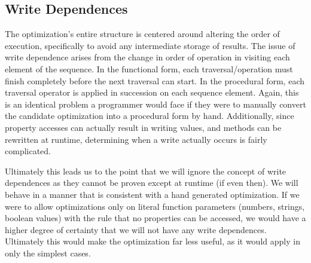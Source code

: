 \subsection{Write Dependences}

The optimization's entire structure is centered around altering the order of execution, specifically to avoid any intermediate storage of results. The issue of write dependence arises from the change in order of operation in visiting each element of the sequence.  In the functional form, each traversal/operation must finish completely before the next traversal can start.  In the procedural form, each traversal operator is applied in succession on each sequence element.  Again, this is an identical problem a programmer would face if they were to manually convert the candidate optimization into a procedural form by hand.  Additionally, since property accesses can actually result in writing values, and methods can be rewritten at runtime, determining when a write actually occurs is fairly complicated. 

Ultimately this leads us to the point that we will ignore the concept of write dependences as they cannot be proven except at runtime (if even then).  We will behave in a manner that is consistent with a hand generated optimization.  If we were to allow optimizations only on literal function parameters (numbers, strings, boolean values) with the rule that no properties can be accessed, we would have a higher degree of certainty that we will not have any write dependences.  Ultimately this would make the optimization far less useful, as it would apply in only the simplest cases.  